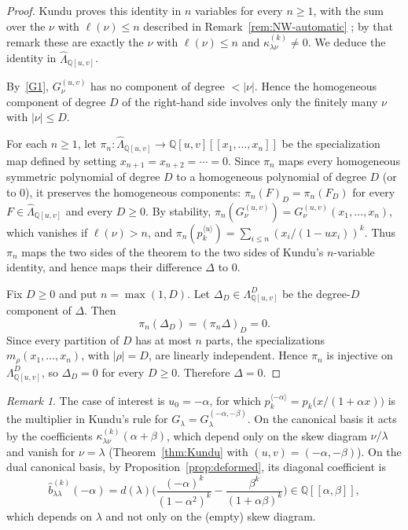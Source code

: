 \documentclass[11pt]{amsart}
\numberwithin{equation}{section}
\theoremstyle{definition}
\theoremstyle{remark}
\newtheorem{remark}[theorem]{Remark}
\newcommand{\Lam}{\Lambda}
\newcommand{\hLam}{\widehat\Lambda}
\newcommand{\QQ}{\mathbb Q}
\begin{document}
\begin{proof}
Kundu proves this identity in $n$ variables for every $n\geq1$, with the sum
over the $\nu$ with $\ell(\nu)\le n$ described in Remark~\ref{rem:NW-automatic}
\cite[Corollary~2]{Kundu}; by that remark these are exactly the $\nu$ with
$\ell(\nu)\le n$ and $\kappa^{(k)}_{\lambda\nu}\ne0$. We deduce the identity in
$\hLam_{\QQ[u,v]}$.

By~\ref{G1}, $G^{(u,v)}_\nu$ has no component of degree $<|\nu|$. Hence the
homogeneous component of degree $D$ of the right-hand side involves only the
finitely many $\nu$ with $|\nu|\le D$.

For each $n\geq1$, let $\pi_n\colon\hLam_{\QQ[u,v]}\to\QQ[u,v][[x_1,\dots,x_n]]$
be the specialization map defined by setting $x_{n+1}=x_{n+2}=\cdots=0$.
Since $\pi_n$ maps every homogeneous symmetric polynomial of degree $D$ to a
homogeneous polynomial of degree $D$ (or to $0$), it preserves the
homogeneous components: $\pi_n(F)_D=\pi_n(F_D)$ for every $F\in\hLam_{\QQ[u,v]}$
and every $D\geq0$. By stability,
$\pi_n(G^{(u,v)}_\nu)=G^{(u,v)}_\nu(x_1,\dots,x_n)$, which vanishes if
$\ell(\nu)>n$, and $\pi_n(p^{\langle u\rangle}_k)=\sum_{i\le n}(x_i/(1-ux_i))^k$.
Thus $\pi_n$ maps the two sides of the theorem to the two sides of Kundu's
$n$-variable identity, and hence maps their difference $\Delta$ to $0$.

Fix $D\geq0$ and put $n=\max(1,D)$. Let
$\Delta_D\in\Lam^D_{\QQ[u,v]}$ be the degree-$D$ component of
$\Delta$. Then
\[
 \pi_n(\Delta_D)=(\pi_n\Delta)_D=0.
\]
Since every partition of $D$ has at most $n$ parts, the
specializations $m_\rho(x_1,\ldots,x_n)$, with $|\rho|=D$,
are linearly independent. Hence $\pi_n$ is injective on
$\Lam^D_{\QQ[u,v]}$, so $\Delta_D=0$ for every $D\geq0$.
Therefore $\Delta=0$.
\end{proof}
\begin{remark}\label{rem:deformed-Kundu}
The case of interest is $u_0=-\alpha$, for which
$p^{\langle-\alpha\rangle}_k=p_k\bigl(x/(1+\alpha x)\bigr)$ is the multiplier in
Kundu's rule for $G_\lambda=G^{(-\alpha,-\beta)}_\lambda$. On the canonical
basis it acts by the coefficients $\kappa^{(k)}_{\lambda\nu}(\alpha+\beta)$,
which depend only on the skew diagram $\nu/\lambda$ and vanish for
$\nu=\lambda$ (Theorem~\ref{thm:Kundu} with $(u,v)=(-\alpha,-\beta)$). On the
dual canonical basis, by Proposition~\ref{prop:deformed}, its diagonal
coefficient is
\[
 \widehat b^{(k)}_{\lambda\lambda}(-\alpha)
 =d(\lambda)\biggl(\frac{(-\alpha)^k}{(1-\alpha^2)^k}
 -\frac{\beta^k}{(1+\alpha\beta)^k}\biggr)\in\QQ[[\alpha,\beta]],
\]
which depends on $\lambda$ and not only on the (empty) skew diagram.
\end{remark}
\end{document}
